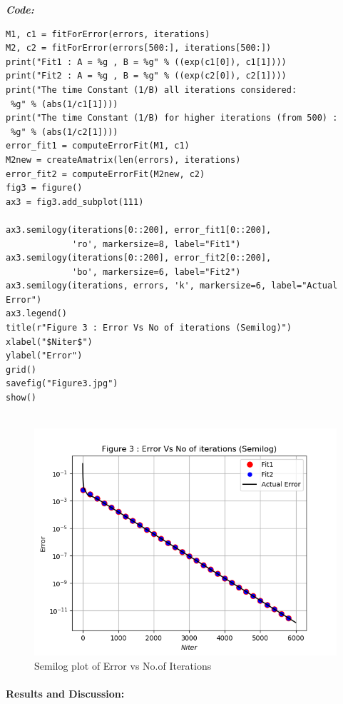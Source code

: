 \documentclass[11pt, a4paper]{article}
\begin{document}
\textit{\textbf{Code:}}
   \begin{lstlisting}
M1, c1 = fitForError(errors, iterations)
M2, c2 = fitForError(errors[500:], iterations[500:])
print("Fit1 : A = %g , B = %g" % ((exp(c1[0]), c1[1])))
print("Fit2 : A = %g , B = %g" % ((exp(c2[0]), c2[1])))
print("The time Constant (1/B) all iterations considered:
 %g" % (abs(1/c1[1])))
print("The time Constant (1/B) for higher iterations (from 500) :
 %g" % (abs(1/c2[1])))
error_fit1 = computeErrorFit(M1, c1)
M2new = createAmatrix(len(errors), iterations)
error_fit2 = computeErrorFit(M2new, c2)
fig3 = figure()
ax3 = fig3.add_subplot(111)

ax3.semilogy(iterations[0::200], error_fit1[0::200],
             'ro', markersize=8, label="Fit1")
ax3.semilogy(iterations[0::200], error_fit2[0::200],
             'bo', markersize=6, label="Fit2")
ax3.semilogy(iterations, errors, 'k', markersize=6, label="Actual Error")
ax3.legend()
title(r"Figure 3 : Error Vs No of iterations (Semilog)")
xlabel("$Niter$")
ylabel("Error")
grid()
savefig("Figure3.jpg")
show()
 
\end{lstlisting}
\newpage
\begin{figure}[!tbh]
 \centering
 \includegraphics[scale=0.8]{./../Extras/Figure_4.png}  
 \caption{Semilog plot of Error vs No.of Iterations}
\end{figure}
\newpage
\paragraph{Results and Discussion:}\label{results-and-discussion}
\end{document}
